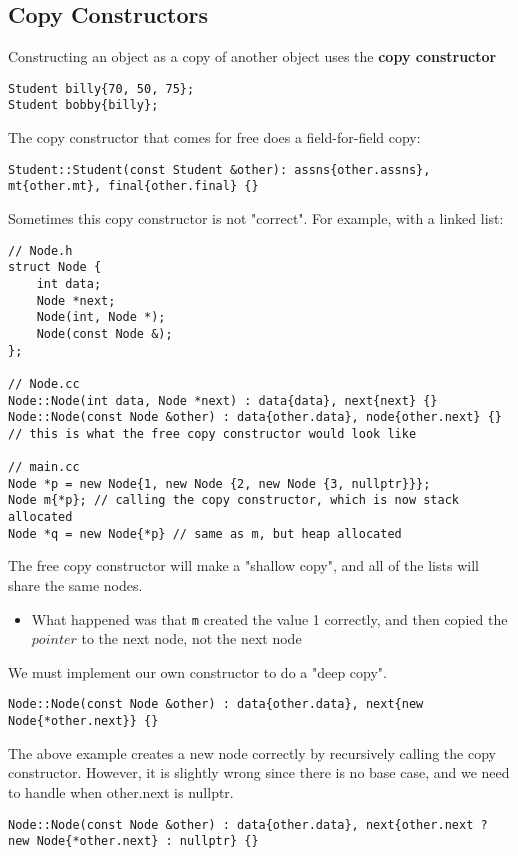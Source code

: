 \documentclass[12pt]{article}
\begin{document}
\subsection{Copy Constructors}
Constructing an object as a copy of another object uses the \textbf{copy constructor} 
\begin{lstlisting}
Student billy{70, 50, 75};
Student bobby{billy};
\end{lstlisting}
The copy constructor that comes for free does a field-for-field copy: 
\begin{lstlisting}
Student::Student(const Student &other): assns{other.assns}, mt{other.mt}, final{other.final} {}
\end{lstlisting}
Sometimes this copy constructor is not "correct". For example, with a linked list:
\begin{lstlisting}
// Node.h
struct Node {
    int data;
    Node *next;
    Node(int, Node *);
    Node(const Node &);
};

// Node.cc
Node::Node(int data, Node *next) : data{data}, next{next} {}
Node::Node(const Node &other) : data{other.data}, node{other.next} {} // this is what the free copy constructor would look like

// main.cc
Node *p = new Node{1, new Node {2, new Node {3, nullptr}}};
Node m{*p}; // calling the copy constructor, which is now stack allocated
Node *q = new Node{*p} // same as m, but heap allocated
\end{lstlisting}
The free copy constructor will make a "shallow copy", and all of the lists will share the same nodes.
\begin{itemize}
    \item What happened was that \lstinline{m} created the value 1 correctly, and then copied the $pointer$ to the next node, not the next node
\end{itemize}
We must implement our own constructor to do a "deep copy".
\begin{lstlisting}
Node::Node(const Node &other) : data{other.data}, next{new Node{*other.next}} {}
\end{lstlisting}
The above example creates a new node correctly by recursively calling the copy constructor. However, it is slightly wrong since there is no base case, and we need to handle when other.next is nullptr.
\begin{lstlisting}
Node::Node(const Node &other) : data{other.data}, next{other.next ? new Node{*other.next} : nullptr} {}
\end{lstlisting}
\end{document}
